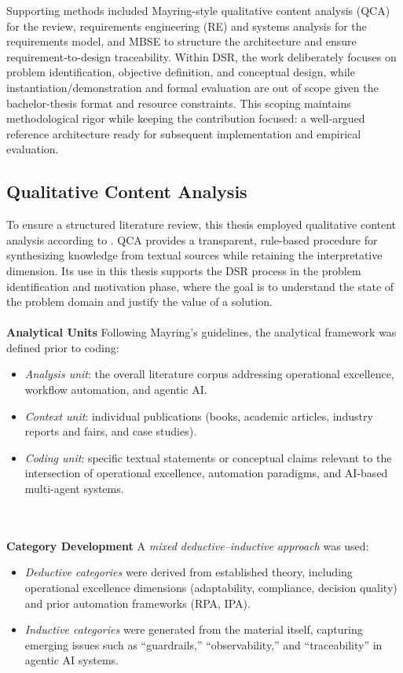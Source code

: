 Supporting methods included Mayring-style qualitative content analysis (QCA) for the review, requirements engineering (RE) and systems analysis for the requirements model, and MBSE to structure the architecture and ensure requirement-to-design traceability. Within DSR, the work deliberately focuses on problem identification, objective definition, and conceptual design, while instantiation/demonstration and formal evaluation are out of scope given the bachelor-thesis format and resource constraints. This scoping maintains methodological rigor while keeping the contribution focused: a well-argued reference architecture ready for subsequent implementation and empirical evaluation.

\subsection{Qualitative Content Analysis}\label{subsec:qca}
To ensure a structured literature review, this thesis employed qualitative content analysis according to \textcite{mayringQualitativeContentAnalysis2022}. QCA provides a transparent, rule-based procedure for synthesizing knowledge from textual sources while retaining the interpretative dimension. Its use in this thesis supports the DSR process \parencite{peffersDesignScienceMethodology2007} in the problem identification and motivation phase, where the goal is to understand the state of the problem domain and justify the value of a solution.\\\\
\textbf{Analytical Units} \quad Following Mayring’s guidelines, the analytical framework was defined prior to coding:
\begin{itemize}
    \item \textit{Analysis unit}: the overall literature corpus addressing operational excellence, workflow automation, and agentic AI.
    \item \textit{Context unit}: individual publications (books, academic articles, industry reports and fairs, and case studies).
    \item \textit{Coding unit}: specific textual statements or conceptual claims relevant to the intersection of operational excellence, automation paradigms, and AI-based multi-agent systems.
\end{itemize}\\\\
\textbf{Category Development} \quad A \textit{mixed deductive–inductive approach} was used:
\begin{itemize}
    \item \textit{Deductive categories} were derived from established theory, including operational excellence dimensions (adaptability, compliance, decision quality) and prior automation frameworks (RPA, IPA).
    \item \textit{Inductive categories} were generated from the material itself, capturing emerging issues such as “guardrails,” “observability,” and “traceability” in agentic AI systems.
\end{itemize}

